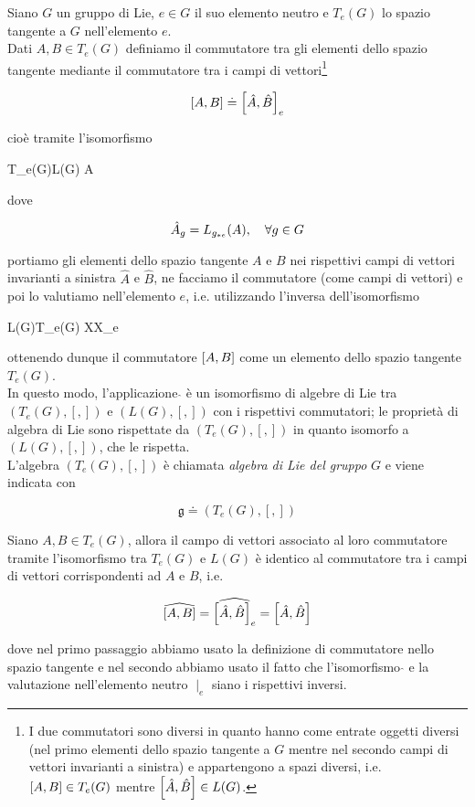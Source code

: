 Siano $ G $ un gruppo di Lie, $ e \in G $ il suo elemento neutro e $ T_{e}(G) $ lo spazio tangente a $ G $ nell'elemento $ e $.\\
Dati $ A,B \in T_{e}(G) $ definiamo il commutatore tra gli elementi dello spazio tangente mediante il commutatore tra i campi di vettori\footnote{%
	I due commutatori sono diversi in quanto hanno come entrate oggetti diversi (nel primo elementi dello spazio tangente a $ G $ mentre nel secondo campi di vettori invarianti a sinistra) e appartengono a spazi diversi, i.e. $ \comm{A}{B} \in T_{e}(G) $ mentre $ \comm{\hat{A}}{\hat{B}} \in L(G) $.%
}

\begin{equation}
	\comm{A}{B} \doteq \comm{\hat{A}}{\hat{B}}_{e}
\end{equation}

cioè tramite l'isomorfismo

\map{\hat{}}%
	{T_{e}(G)}{L(G)}%
	{A}{}
	
dove

\begin{equation}
	\hat{A}_{g} = L_{g_{*e}}(A) \qcomma \forall g \in G
\end{equation}

portiamo gli elementi dello spazio tangente $ A $ e $ B $ nei rispettivi campi di vettori invarianti a sinistra $ \hat{A} $ e $ \hat{B} $, ne facciamo il commutatore (come campi di vettori) e poi lo valutiamo nell'elemento $ e $, i.e. utilizzando l'inversa dell'isomorfismo

%
	{L(G)}{T_{e}(G)}%
	{X}{X_{e}}

ottenendo dunque il commutatore $ \comm{A}{B} $ come un elemento dello spazio tangente $ T_{e}(G) $.\\
In questo modo, l'applicazione $ \hat{} $ è un isomorfismo di algebre di Lie tra $ (T_{e}(G),[,]) $ e $ (L(G),[,]) $ con i rispettivi commutatori; le proprietà di algebra di Lie sono rispettate da $ (T_{e}(G),[,]) $ in quanto isomorfo a $ (L(G),[,]) $, che le rispetta.\\
L'algebra $ (T_{e}(G),[,]) $ è chiamata \textit{algebra di Lie del gruppo} $ G $ e viene indicata con

\begin{equation}
	\mathfrak{g} \doteq (T_{e}(G),[,])
\end{equation}

\begin{remark}
	Siano $ A,B \in T_{e}(G) $, allora il campo di vettori associato al loro commutatore tramite l'isomorfismo tra $ T_{e}(G) $ e $ L(G) $ è identico al commutatore tra i campi di vettori corrispondenti ad $ A $ e $ B $, i.e.
	
	\begin{equation}
		\widehat{[A,B]} = \widehat{\comm{\hat{A}}{\hat{B}}_{e}} = \comm{\hat{A}}{\hat{B}}
	\end{equation}

	dove nel primo passaggio abbiamo usato la definizione di commutatore nello spazio tangente e nel secondo abbiamo usato il fatto che l'isomorfismo $ \hat{} $ e la valutazione nell'elemento neutro $ \mid_{e} $ siano i rispettivi inversi.
\end{remark}

